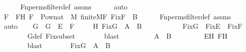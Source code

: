 \begin{isabellebody}
\ \ \ \ \isamarkupfalse%
\ Fn{\isacharunderscore}{\kern0pt}perms{\isacharunderscore}{\kern0pt}filter{\isacharunderscore}{\kern0pt}def\ assms\isanewline
\ \ \ \ \isamarkupfalse%
\ auto\isanewline
\ \ \isamarkupfalse%
\ F\ \ FH{\isacharcolon}{\kern0pt}\ {\isachardoublequoteopen}F\ {\isasymin}\ Pow{\isacharparenleft}{\kern0pt}nat{\isacharparenright}{\kern0pt}\ {\isasyminter}\ M{\isachardoublequoteclose}\ {\isachardoublequoteopen}finite{\isacharunderscore}{\kern0pt}M{\isacharparenleft}{\kern0pt}F{\isacharparenright}{\kern0pt}{\isachardoublequoteclose}\ {\isachardoublequoteopen}Fix{\isacharparenleft}{\kern0pt}F{\isacharparenright}{\kern0pt}\ {\isasymsubseteq}\ B{\isachardoublequoteclose}\isanewline
\ \ \ \ \isamarkupfalse%
\ Fn{\isacharunderscore}{\kern0pt}perms{\isacharunderscore}{\kern0pt}filter{\isacharunderscore}{\kern0pt}def\ assms\isanewline
\ \ \ \ \isamarkupfalse%
\ auto\isanewline
\isanewline
\ \ \isamarkupfalse%
\ G\ \ {\isachardoublequoteopen}G\ {\isasymequiv}\ E\ {\isasymunion}\ F{\isachardoublequoteclose}\ \isanewline
\ \ \isamarkupfalse%
\ H{\isacharcolon}{\kern0pt}\ {\isachardoublequoteopen}Fix{\isacharparenleft}{\kern0pt}G{\isacharparenright}{\kern0pt}\ {\isasymsubseteq}\ A\ {\isasyminter}\ B{\isachardoublequoteclose}\ \isanewline
\ \ \isamarkupfalse%
\ {\isacharminus}{\kern0pt}\isanewline
\ \ \ \ \isamarkupfalse%
\ {\isachardoublequoteopen}Fix{\isacharparenleft}{\kern0pt}G{\isacharparenright}{\kern0pt}\ {\isasymsubseteq}\ Fix{\isacharparenleft}{\kern0pt}E{\isacharparenright}{\kern0pt}\ {\isasyminter}\ Fix{\isacharparenleft}{\kern0pt}F{\isacharparenright}{\kern0pt}{\isachardoublequoteclose}\ \isanewline
\ \ \ \ \ \ \isamarkupfalse%
\ G{\isacharunderscore}{\kern0pt}def\ Fix{\isacharunderscore}{\kern0pt}subset\isanewline
\ \ \ \ \ \ \isamarkupfalse%
\ blast\isanewline
\ \ \ \ \isamarkupfalse%
\ \isamarkupfalse%
\ {\isachardoublequoteopen}{\isachardot}{\kern0pt}{\isachardot}{\kern0pt}{\isachardot}{\kern0pt}\ {\isasymsubseteq}\ A\ {\isasyminter}\ B{\isachardoublequoteclose}\ \isanewline
\ \ \ \ \ \ \isamarkupfalse%
\ EH\ FH\ \isanewline
\ \ \ \ \ \ \isamarkupfalse%
\ blast\isanewline
\ \ \ \ \isamarkupfalse%
\ \isamarkupfalse%
\ {\isachardoublequoteopen}Fix{\isacharparenleft}{\kern0pt}G{\isacharparenright}{\kern0pt}\ {\isasymsubseteq}\ A\ {\isasyminter}\ B{\isachardoublequoteclose}\ \isamarkupfalse%

\end{isabellebody}
